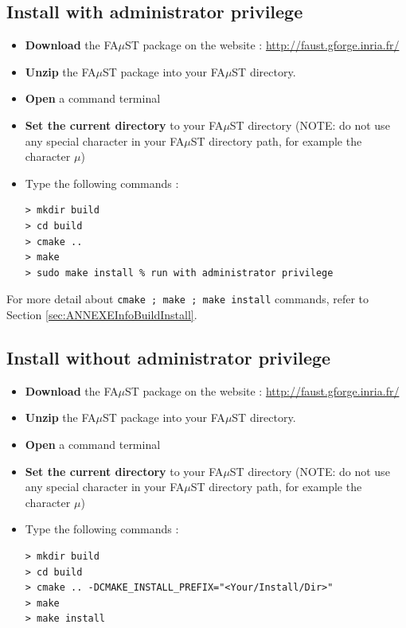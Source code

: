 \subsection{Install with administrator privilege}\label{sec:UnixBuildInstallAdmin}
\begin{itemize}
\item \textbf{Download} the FA$\mu$ST package on the website :  \url{http://faust.gforge.inria.fr/}
\item \textbf{Unzip} the FA$\mu$ST package into your FA$\mu$ST directory.
\item \textbf{Open} a command terminal
\item \textbf{Set the current directory} to your FA$\mu$ST directory (NOTE: do not use any special character in your FA$\mu$ST directory path, for example the character $\mu$)
\item Type the following commands : 
\begin{lstlisting}
> mkdir build
> cd build
> cmake ..
> make
> sudo make install % run with administrator privilege
\end{lstlisting}
\end{itemize}

For more detail about \texttt{cmake ; make ; make install} commands, refer to Section \ref{sec:ANNEXEInfoBuildInstall}.


\subsection{Install without administrator privilege}\label{sec:UnixBuildInstallNOAdmin}

\begin{itemize}
\item \textbf{Download} the FA$\mu$ST package on the website :  \url{http://faust.gforge.inria.fr/}
\item \textbf{Unzip} the FA$\mu$ST package into your FA$\mu$ST directory.
\item \textbf{Open} a command terminal
\item \textbf{Set the current directory} to your FA$\mu$ST directory (NOTE: do not use any special character in your FA$\mu$ST directory path, for example the character $\mu$)
\item Type the following commands : 
\begin{lstlisting}
> mkdir build
> cd build
> cmake .. -DCMAKE_INSTALL_PREFIX="<Your/Install/Dir>"
> make
> make install
\end{lstlisting}
\end{itemize}

